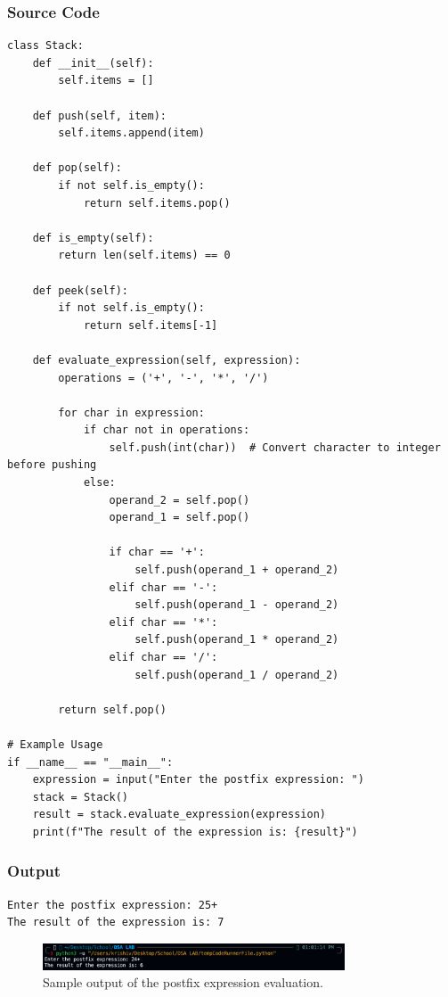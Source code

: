 \documentclass[a4paper,12pt]{article}
\begin{document}
\subsubsection*{Source Code}
\begin{lstlisting}
class Stack:
    def __init__(self):
        self.items = []

    def push(self, item):
        self.items.append(item)

    def pop(self):
        if not self.is_empty():
            return self.items.pop()

    def is_empty(self):
        return len(self.items) == 0

    def peek(self):
        if not self.is_empty():
            return self.items[-1]

    def evaluate_expression(self, expression):
        operations = ('+', '-', '*', '/')

        for char in expression:
            if char not in operations:
                self.push(int(char))  # Convert character to integer before pushing
            else:
                operand_2 = self.pop()
                operand_1 = self.pop()

                if char == '+':
                    self.push(operand_1 + operand_2)
                elif char == '-':
                    self.push(operand_1 - operand_2)
                elif char == '*':
                    self.push(operand_1 * operand_2)
                elif char == '/':
                    self.push(operand_1 / operand_2)

        return self.pop()

# Example Usage
if __name__ == "__main__":
    expression = input("Enter the postfix expression: ")
    stack = Stack()
    result = stack.evaluate_expression(expression)
    print(f"The result of the expression is: {result}")
\end{lstlisting}

\subsubsection*{Output}
\begin{verbatim}
Enter the postfix expression: 25+
The result of the expression is: 7
\end{verbatim}

\begin{figure}[h]
    \centering
    \includegraphics[width=0.8\textwidth]{output_screenshot_exp2.png}
    \caption{Sample output of the postfix expression evaluation.}
    \label{fig:output_exp2}
\end{figure}
\end{document}
